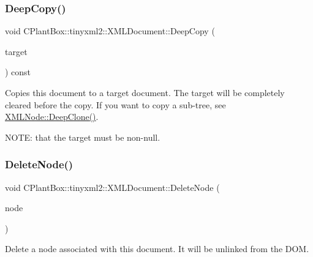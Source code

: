 \subsubsection{\texorpdfstring{Deep\+Copy()}{DeepCopy()}}
{\footnotesize\ttfamily void C\+Plant\+Box\+::tinyxml2\+::\+X\+M\+L\+Document\+::\+Deep\+Copy (\begin{DoxyParamCaption}\item[{\hyperlink{classCPlantBox_1_1tinyxml2_1_1XMLDocument}{X\+M\+L\+Document} $\ast$}]{target }\end{DoxyParamCaption}) const}

Copies this document to a target document. The target will be completely cleared before the copy. If you want to copy a sub-\/tree, see \hyperlink{classCPlantBox_1_1tinyxml2_1_1XMLNode_a444bb1393c147907bf4111439b377c15}{X\+M\+L\+Node\+::\+Deep\+Clone()}.

N\+O\+TE\+: that the \textquotesingle{}target\textquotesingle{} must be non-\/null. \mbox{\label{classCPlantBox_1_1tinyxml2_1_1XMLDocument_ab6a934839aa91d69977e874fb7bb29be}} 
\subsubsection{\texorpdfstring{Delete\+Node()}{DeleteNode()}}
{\footnotesize\ttfamily void C\+Plant\+Box\+::tinyxml2\+::\+X\+M\+L\+Document\+::\+Delete\+Node (\begin{DoxyParamCaption}\item[{\hyperlink{classCPlantBox_1_1tinyxml2_1_1XMLNode}{X\+M\+L\+Node} $\ast$}]{node }\end{DoxyParamCaption})}

Delete a node associated with this document. It will be unlinked from the D\+OM. \mbox{\label{classCPlantBox_1_1tinyxml2_1_1XMLDocument_a62a0f2df44e9c002762f97c28db165d1}} 
